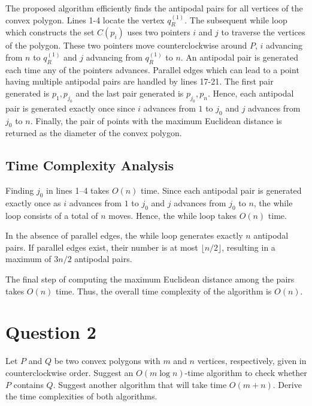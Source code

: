 \documentclass[12pt]{article}
\begin{document}
The proposed algorithm efficiently finds the antipodal pairs for all vertices of the convex polygon. Lines 1-4 locate the vertex \(q_R^{(1)}\). The subsequent while loop which constructs the set \(C(p_{i})\) uses two pointers \(i\) and \(j\) to traverse the vertices of the polygon. These two pointers move counterclockwise around \(P\), \(i\) advancing from \(n\) to \(q_R^{(1)}\) and \(j\) advancing from \(q_R^{(1)}\) to \(n\). An antipodal pair is generated each time any of the pointers advances. Parallel edges which can lead to a point having multiple antipodal pairs are handled by lines 17-21. The first pair generated is \(p_1, p_{j_0}\) and the last pair generated is \(p_{j_0}, p_n\). Hence, each antipodal pair is generated exactly once since \(i\) advances from \(1\) to \(j_0\) and \(j\) advances from \(j_0\) to \(n\). Finally, the pair of points with the maximum Euclidean distance is returned as the diameter of the convex polygon.

\subsection*{Time Complexity Analysis}

Finding \(j_0\) in lines 1--4 takes \(O(n)\) time. Since each antipodal pair is generated exactly once as \(i\) advances from \(1\) to \(j_0\) and \(j\) advances from \(j_0\) to \(n\), the while loop consists of a total of \(n\) moves. Hence, the while loop takes \(O(n)\) time.

In the absence of parallel edges, the while loop generates exactly \(n\) antipodal pairs. If parallel edges exist, their number is at most \(\lfloor n/2 \rfloor\), resulting in a maximum of \(3n/2\) antipodal pairs.

The final step of computing the maximum Euclidean distance among the pairs takes \(O(n)\) time. Thus, the overall time complexity of the algorithm is \(O(n)\).


\section*{Question 2}


Let \( P \) and \( Q \) be two convex polygons with \( m \) and \( n \) vertices, respectively, given in counterclockwise order.   Suggest an \( O(m \log n) \)-time algorithm to check whether \( P \) contains \( Q \). Suggest another algorithm that will take time \( O(m + n) \). Derive the time complexities of both algorithms.
\end{document}
